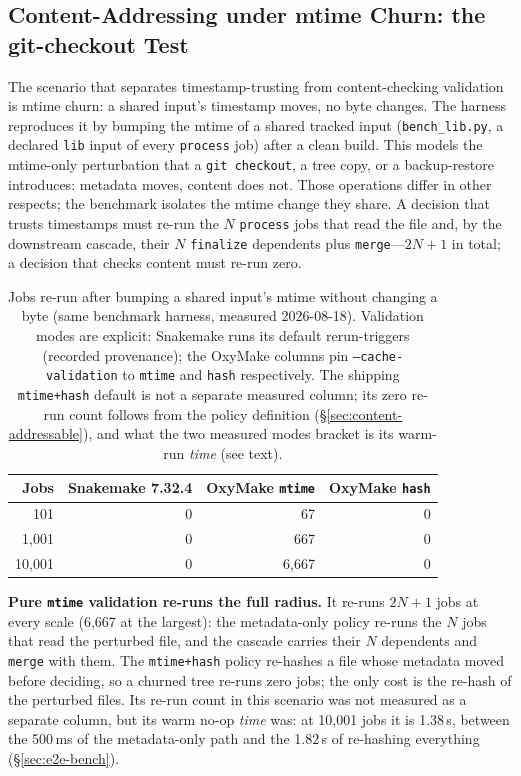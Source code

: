 \documentclass[12pt,a4paper]{article}
\newcommand{\code}[1]{{\texttt{\small\color{inlinecode}#1}}}
\begin{document}
\subsection{Content-Addressing under mtime Churn: the git-checkout Test}
\label{sec:git-checkout-bench}

The scenario that separates timestamp-trusting from content-checking
validation is mtime churn: a shared input's timestamp moves, no byte
changes. The
harness reproduces it by bumping the mtime of a shared tracked input
(\code{bench\_lib.py}, a declared \code{lib} input of every
\code{process} job) after a clean build. This models the mtime-only
perturbation that a \code{git checkout}, a tree copy, or a
backup-restore introduces: metadata moves, content does not. Those
operations differ in other respects; the benchmark isolates the mtime
change they share. A decision that trusts timestamps must re-run the
$N$ \code{process} jobs that read the file and, by the downstream
cascade, their $N$ \code{finalize} dependents plus \code{merge}---$2N{+}1$
in total; a decision that checks content must re-run zero.

\begin{table}[htbp]
\centering\small
\begin{tabular}{@{}rrrr@{}}
\toprule
\textbf{Jobs} & \textbf{Snakemake 7.32.4} & \textbf{OxyMake \code{mtime}} & \textbf{OxyMake \code{hash}} \\
\midrule
101      & 0 &      67 & 0 \\
1{,}001  & 0 &     667 & 0 \\
10{,}001 & 0 & 6{,}667 & 0 \\
\bottomrule
\end{tabular}
\caption{Jobs re-run after bumping a shared input's mtime without
  changing a byte (same benchmark harness, measured 2026-08-18).
  Validation modes are explicit: Snakemake runs its default
  rerun-triggers (recorded provenance); the OxyMake columns pin
  \code{--cache-validation} to \code{mtime} and \code{hash}
  respectively. The shipping \code{mtime+hash} default is not a
  separate measured column; its zero re-run count follows from the
  policy definition (\S\ref{sec:content-addressable}), and what the two
  measured modes bracket is its warm-run \emph{time} (see text).}
\label{tab:mtime-churn}
\end{table}

\noindent\textbf{Pure \code{mtime} validation re-runs the full radius.} It re-runs
$2N{+}1$ jobs at every scale (6,667 at the largest): the metadata-only
policy re-runs the $N$ jobs that read the perturbed file, and the
cascade carries their $N$ dependents and \code{merge} with them. The
\code{mtime+hash} policy re-hashes a file whose metadata moved before
deciding, so a churned tree re-runs zero jobs; the only cost is the
re-hash of the perturbed files. Its re-run count in this scenario was
not measured as a separate column, but its warm no-op \emph{time} was:
at 10{,}001 jobs it is 1.38\,s, between the 500\,ms of the
metadata-only path and the 1.82\,s of re-hashing everything
(\S\ref{sec:e2e-bench}).
\end{document}
